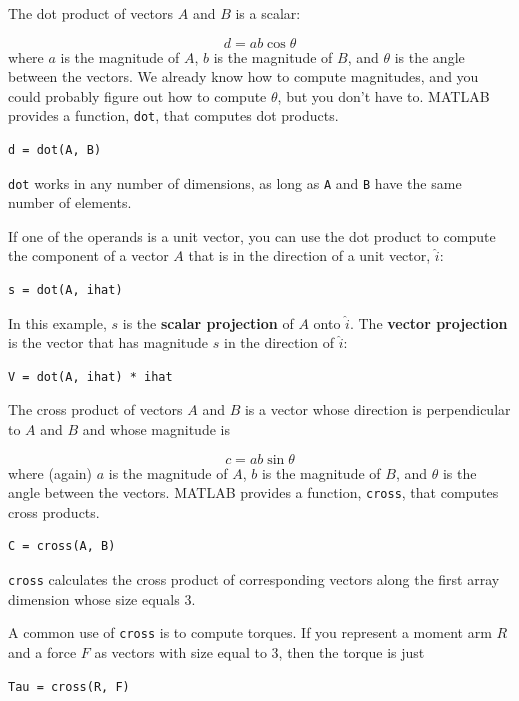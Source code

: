 \documentclass{book}
\begin{document}
The dot product of vectors $A$ and $B$ is a scalar:

\[ d = a b \cos \theta \]
%
where $a$ is the magnitude of $A$, $b$ is the magnitude of $B$,
and $\theta$ is the angle between the vectors.  We already know
how to compute magnitudes, and you could probably figure out
how to compute $\theta$, but you don't have to.  MATLAB provides
a function, {\tt dot}, that computes dot products.

\begin{verbatim}
d = dot(A, B)
\end{verbatim}

{\tt dot} works in any number of dimensions, as long as {\tt A}
and {\tt B} have the same number of elements.

If one of the operands is a unit vector, you can use the dot
product to compute the component of a vector $A$ that is in
the direction of a unit vector, $\hat{i}$:

\begin{verbatim}
s = dot(A, ihat)
\end{verbatim}

In this example, $s$ is the {\bf scalar projection} of $A$
onto $\hat{i}$.  The {\bf vector projection} is the vector
that has magnitude $s$ in the direction of $\hat{i}$:

\begin{verbatim}
V = dot(A, ihat) * ihat
\end{verbatim}

The cross product of vectors $A$ and $B$ is a vector whose direction
is perpendicular to $A$ and $B$ and whose magnitude is

\[ c = a b \sin \theta \]
%
where (again) $a$ is the magnitude of $A$, $b$ is the magnitude of
$B$, and $\theta$ is the angle between the vectors.  MATLAB provides
a function, {\tt cross}, that computes cross products.

\begin{verbatim}
C = cross(A, B)
\end{verbatim}

{\tt cross} calculates the cross product of corresponding vectors along 
the first array dimension whose size equals 3.

A common use of {\tt cross} is to compute torques.  If you represent
a moment arm $R$ and a force $F$ as vectors with size equal to 3, then
the torque is just

\begin{verbatim}
Tau = cross(R, F)
\end{verbatim}
\end{document}
